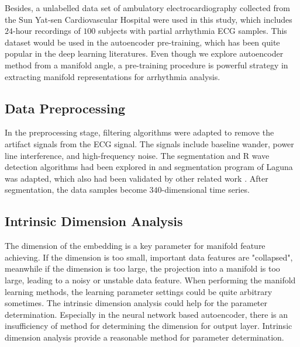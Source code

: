 \documentclass[journal]{IEEEtran}
\begin{document}
Besides, a unlabelled data set of ambulatory electrocardiography collected from the Sun Yat-sen Cardiovascular Hospital were used in this study, which includes $24$-hour recordings of $100$ subjects with partial arrhythmia ECG samples. 
This dataset would be used in the autoencoder pre-training, which has been quite popular in the deep learning literatures.
Even though we explore autoencoder method from a manifold angle, a pre-training procedure is powerful strategy in extracting manifold representations for arrhythmia analysis.




%
%
\subsection{Data Preprocessing}
In the preprocessing stage, filtering algorithms were adapted to remove the artifact signals from the ECG signal. 
The signals include baseline wander, power line interference, and high-frequency noise. 
The segmentation and R wave detection algorithms had been explored in \cite{afonso} and segmentation program of Laguna \cite{sornmo2006electrocardiogram} was adapted, which also had been validated by other related work \cite{chaza}. 
After segmentation, the data samples become $340$-dimensional time series.



%
%
\subsection{Intrinsic Dimension Analysis}





The dimension of the embedding is a key parameter for manifold feature achieving.  
If the dimension is too small, important data features are "collapsed", meanwhile if the dimension is too large, the projection into a manifold is too large, leading to a noisy or unstable data feature.
When performing the manifold learning methods, the learning parameter settings could be quite arbitrary sometimes.
The intrinsic dimension analysis could help for the parameter determination.
Especially in the neural network based autoencoder, there is an insufficiency of method for determining the dimension for output layer.
Intrinsic dimension analysis provide a reasonable method for parameter determination.
\end{document}
